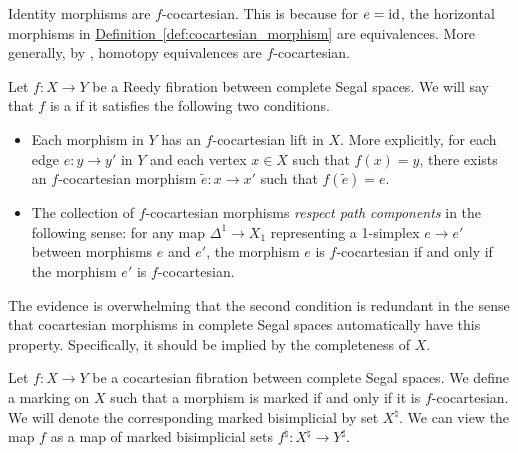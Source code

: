 \documentclass[main.tex]{subfiles}
\begin{document}
\begin{example}
  Identity morphisms are $f$-cocartesian. This is because for $e = \mathrm{id}$, the horizontal morphisms in \hyperref[def:cocartesian_morphism]{Definition~\ref*{def:cocartesian_morphism}} are equivalences. More generally, by \cite[Lemma\ 11.6]{rezk2001model}, homotopy equivalences are $f$-cocartesian.
\end{example}

\begin{definition}
  \label{def:cocartesian_fibration_between_complete_segal_spaces}
  Let $f\colon X \to Y$ be a Reedy fibration between complete Segal spaces. We will say that $f$ is a  if it satisfies the following two conditions. 
  \begin{itemize}
    \item Each morphism in $Y$ has an $f$-cocartesian lift in $X$. More explicitly, for each edge $e\colon y \to y'$ in $Y$ and each vertex $x \in X$ such that $f(x) = y$, there exists an $f$-cocartesian morphism $\tilde{e}\colon x \to x'$ such that $f(\tilde{e}) = e$.

    \item The collection of $f$-cocartesian morphisms \emph{respect path components} in the following sense: for any map $\Delta^{1} \to X_{1}$ representing a 1-simplex $e \to e'$ between morphisms $e$ and $e'$, the morphism $e$ is $f$-cocartesian if and only if the morphism $e'$ is $f$-cocartesian.
  \end{itemize}
\end{definition}

\begin{note}
  The evidence is overwhelming that the second condition is redundant in the sense that cocartesian morphisms in complete Segal spaces automatically have this property. Specifically, it should be implied by the completeness of $X$.
\end{note}

\begin{definition}
  \label{def:cocoartesian_marking_on_complete_segal_spaces}
  Let $f\colon X \to Y$ be a cocartesian fibration between complete Segal spaces. We define a marking on $X$ such that a morphism is marked if and only if it is $f$-cocartesian. We will denote the corresponding marked bisimplicial by set $X^{\natural}$. We can view the map $f$ as a map of marked bisimplicial sets $f^{\natural}\colon X^{\natural} \to Y^{\sharp}$.
\end{definition}
\end{document}
